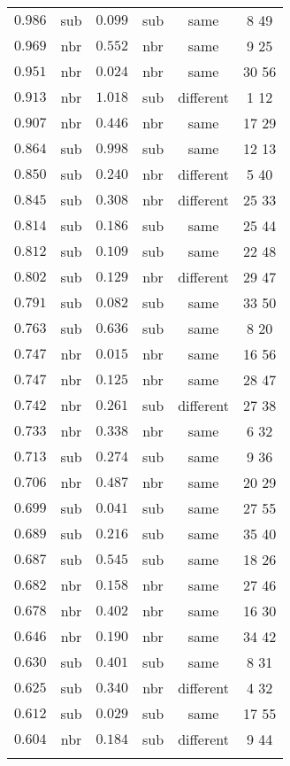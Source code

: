 \begin{table}[!htbp]
\begin{tabular}{@{\extracolsep{5pt}} cccccc}
$0.986$ & sub & $0.099$ & sub & same & 8 49  \\ 
$0.969$ & nbr & $0.552$ & nbr & same & 9 25  \\ 
$0.951$ & nbr & $0.024$ & nbr & same & 30 56  \\ 
$0.913$ & nbr & $1.018$ & sub & different & 1 12  \\ 
$0.907$ & nbr & $0.446$ & nbr & same & 17 29  \\ 
$0.864$ & sub & $0.998$ & sub & same & 12 13  \\ 
$0.850$ & sub & $0.240$ & nbr & different & 5 40  \\ 
$0.845$ & sub & $0.308$ & nbr & different & 25 33  \\ 
$0.814$ & sub & $0.186$ & sub & same & 25 44  \\ 
$0.812$ & sub & $0.109$ & sub & same & 22 48  \\ 
$0.802$ & sub & $0.129$ & nbr & different & 29 47  \\ 
$0.791$ & sub & $0.082$ & sub & same & 33 50  \\ 
$0.763$ & sub & $0.636$ & sub & same & 8 20  \\ 
$0.747$ & nbr & $0.015$ & nbr & same & 16 56  \\ 
$0.747$ & nbr & $0.125$ & nbr & same & 28 47  \\ 
$0.742$ & nbr & $0.261$ & sub & different & 27 38  \\ 
$0.733$ & nbr & $0.338$ & nbr & same & 6 32  \\ 
$0.713$ & sub & $0.274$ & sub & same & 9 36  \\ 
$0.706$ & nbr & $0.487$ & nbr & same & 20 29  \\ 
$0.699$ & sub & $0.041$ & sub & same & 27 55  \\ 
$0.689$ & sub & $0.216$ & sub & same & 35 40  \\ 
$0.687$ & sub & $0.545$ & sub & same & 18 26  \\ 
$0.682$ & nbr & $0.158$ & nbr & same & 27 46  \\ 
$0.678$ & nbr & $0.402$ & nbr & same & 16 30  \\ 
$0.646$ & nbr & $0.190$ & nbr & same & 34 42  \\ 
$0.630$ & sub & $0.401$ & sub & same & 8 31  \\ 
$0.625$ & sub & $0.340$ & nbr & different & 4 32  \\ 
$0.612$ & sub & $0.029$ & sub & same & 17 55  \\ 
$0.604$ & nbr & $0.184$ & sub & different & 9 44  \\ 
\hline \\[-1.8ex] 
\end{tabular} 
\end{table} 
